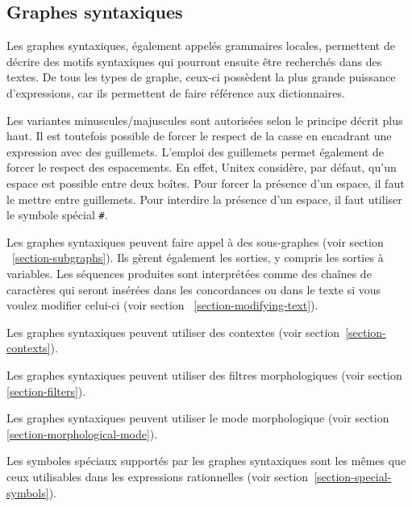\subsection{Graphes syntaxiques}
\label{syntactic-graphs}
Les graphes syntaxiques, également appelés grammaires locales, permettent de décrire
des motifs syntaxiques qui pourront ensuite être recherchés dans des textes. De tous les
types de graphe, ceux-ci possèdent la plus grande puissance d’expressions, car ils permettent
de faire référence aux dictionnaires.

\bigskip
\noindent Les variantes minuscules/majuscules sont autorisées selon le principe décrit plus haut.
Il est toutefois possible de forcer le respect de la casse en encadrant une expression avec des
guillemets. L’emploi des guillemets permet également de forcer le respect des espacements.
En effet, Unitex considère, par défaut, qu’un espace est possible entre deux boîtes. Pour forcer
la présence d’un espace, il faut le mettre entre guillemets. Pour interdire la présence d’un
espace, il faut utiliser le symbole spécial \verb+#+.\index{\verbt{\#}}

\bigskip
\noindent Les graphes syntaxiques peuvent faire appel à des sous-graphes (voir section
~\ref{section-subgraphs}). Ils gèrent également les sorties, y compris les sorties à variables.
Les séquences produites sont interprétées comme des chaînes de caractères qui seront insérées
dans les concordances ou dans le texte si vous voulez modifier celui-ci (voir section
~\ref{section-modifying-text}).

\bigskip
\noindent Les graphes syntaxiques peuvent utiliser des contextes (voir section~\ref{section-contexts}).

\bigskip
\noindent Les graphes syntaxiques peuvent utiliser des filtres morphologiques (voir section
\ref{section-filters}).

\bigskip
\noindent Les graphes syntaxiques peuvent utiliser le mode morphologique (voir section
\ref{section-morphological-mode}).

\bigskip
\noindent Les symboles spéciaux supportés par les graphes syntaxiques sont les mêmes que ceux
utilisables dans les expressions rationnelles (voir section~\ref{section-special-symbols}).

